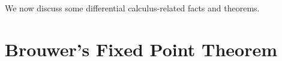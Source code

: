 We now discuss some differential calculus-related facts and theorems.

\section{Brouwer's Fixed Point Theorem}

